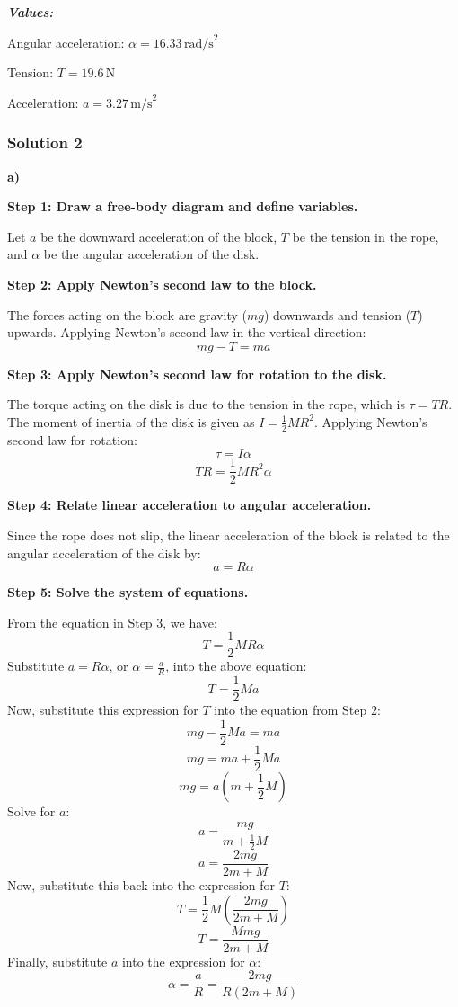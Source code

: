 \documentclass{article}
\begin{document}
\textit{\textbf{Values:}}

Angular acceleration: $\alpha = 16.33 \, \text{rad/s}^2$

Tension: $T = 19.6 \, \text{N}$

Acceleration: $a = 3.27 \, \text{m/s}^2$

\subsubsection{Solution 2}
\textbf{a)}

\textbf{Step 1: Draw a free-body diagram and define variables.}

Let $a$ be the downward acceleration of the block, $T$ be the tension in the rope, and $\alpha$ be the angular acceleration of the disk.

\textbf{Step 2: Apply Newton's second law to the block.}

The forces acting on the block are gravity ($mg$) downwards and tension ($T$) upwards. Applying Newton's second law in the vertical direction:
$$mg - T = ma$$

\textbf{Step 3: Apply Newton's second law for rotation to the disk.}

The torque acting on the disk is due to the tension in the rope, which is $\tau = TR$. The moment of inertia of the disk is given as $I = \frac{1}{2}MR^2$. Applying Newton's second law for rotation:
$$\tau = I\alpha$$
$$TR = \frac{1}{2}MR^2\alpha$$

\textbf{Step 4: Relate linear acceleration to angular acceleration.}

Since the rope does not slip, the linear acceleration of the block is related to the angular acceleration of the disk by:
$$a = R\alpha$$

\textbf{Step 5: Solve the system of equations.}

From the equation in Step 3, we have:
$$T = \frac{1}{2}MR\alpha$$
Substitute $a = R\alpha$, or $\alpha = \frac{a}{R}$, into the above equation:
$$T = \frac{1}{2}Ma$$
Now, substitute this expression for $T$ into the equation from Step 2:
$$mg - \frac{1}{2}Ma = ma$$
$$mg = ma + \frac{1}{2}Ma$$
$$mg = a(m + \frac{1}{2}M)$$
Solve for $a$:
$$a = \frac{mg}{m + \frac{1}{2}M}$$
$$a = \frac{2mg}{2m + M}$$
Now, substitute this back into the expression for $T$:
$$T = \frac{1}{2}M \left(\frac{2mg}{2m + M}\right)$$
$$T = \frac{Mmg}{2m + M}$$
Finally, substitute $a$ into the expression for $\alpha$:
$$\alpha = \frac{a}{R} = \frac{2mg}{R(2m+M)}$$
\end{document}
